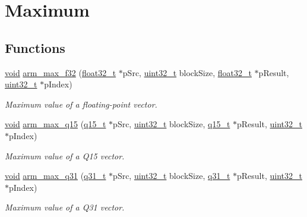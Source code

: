 \hypertarget{group___max}{\section{Maximum}
\label{group___max}
}
\subsection*{Functions}
\begin{DoxyCompactItemize}
\item 
\hyperlink{group___n_a_m_e_ga18028b8badbf1ea7e704ccac3c488e82}{void} \hyperlink{group___max_ga5b89d1b04575aeec494f678695fb87d8}{arm\-\_\-max\-\_\-f32} (\hyperlink{arm__math_8h_a4611b605e45ab401f02cab15c5e38715}{float32\-\_\-t} $\ast$p\-Src, \hyperlink{stdint_8h_a435d1572bf3f880d55459d9805097f62}{uint32\-\_\-t} block\-Size, \hyperlink{arm__math_8h_a4611b605e45ab401f02cab15c5e38715}{float32\-\_\-t} $\ast$p\-Result, \hyperlink{stdint_8h_a435d1572bf3f880d55459d9805097f62}{uint32\-\_\-t} $\ast$p\-Index)
\begin{DoxyCompactList}\small\item\em Maximum value of a floating-\/point vector. \end{DoxyCompactList}\item 
\hyperlink{group___n_a_m_e_ga18028b8badbf1ea7e704ccac3c488e82}{void} \hyperlink{group___max_gac132856c68f4bf2a056eaad5921c7880}{arm\-\_\-max\-\_\-q15} (\hyperlink{arm__math_8h_ab5a8fb21a5b3b983d5f54f31614052ea}{q15\-\_\-t} $\ast$p\-Src, \hyperlink{stdint_8h_a435d1572bf3f880d55459d9805097f62}{uint32\-\_\-t} block\-Size, \hyperlink{arm__math_8h_ab5a8fb21a5b3b983d5f54f31614052ea}{q15\-\_\-t} $\ast$p\-Result, \hyperlink{stdint_8h_a435d1572bf3f880d55459d9805097f62}{uint32\-\_\-t} $\ast$p\-Index)
\begin{DoxyCompactList}\small\item\em Maximum value of a Q15 vector. \end{DoxyCompactList}\item 
\hyperlink{group___n_a_m_e_ga18028b8badbf1ea7e704ccac3c488e82}{void} \hyperlink{group___max_gaff7cbd4e955382def06724cc4cc85795}{arm\-\_\-max\-\_\-q31} (\hyperlink{arm__math_8h_adc89a3547f5324b7b3b95adec3806bc0}{q31\-\_\-t} $\ast$p\-Src, \hyperlink{stdint_8h_a435d1572bf3f880d55459d9805097f62}{uint32\-\_\-t} block\-Size, \hyperlink{arm__math_8h_adc89a3547f5324b7b3b95adec3806bc0}{q31\-\_\-t} $\ast$p\-Result, \hyperlink{stdint_8h_a435d1572bf3f880d55459d9805097f62}{uint32\-\_\-t} $\ast$p\-Index)
\begin{DoxyCompactList}\small\item\em Maximum value of a Q31 vector. \end{DoxyCompactList}\item 

\end{DoxyCompactItemize}
